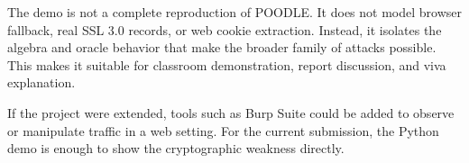 The demo is not a complete reproduction of POODLE. It does not model browser fallback, real SSL 3.0 records, or web cookie extraction. Instead, it isolates the algebra and oracle behavior that make the broader family of attacks possible. This makes it suitable for classroom demonstration, report discussion, and viva explanation.

If the project were extended, tools such as Burp Suite could be added to observe or manipulate traffic in a web setting. For the current submission, the Python demo is enough to show the cryptographic weakness directly.
